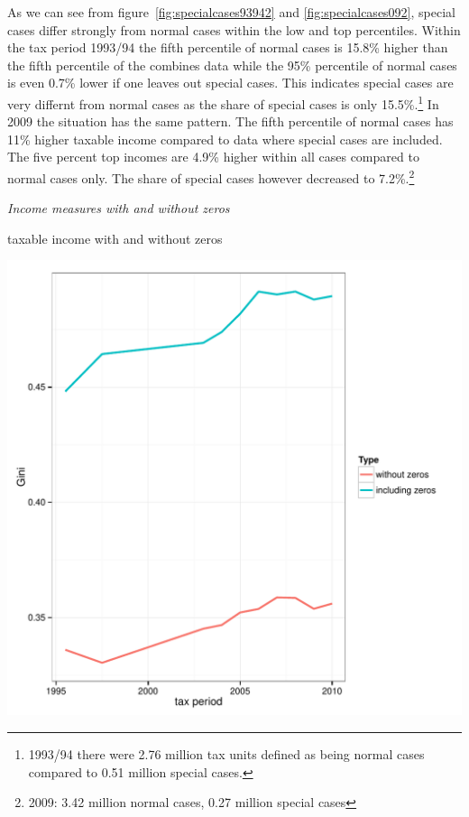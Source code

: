 \documentclass[twoside]{article}\usepackage[]{graphicx}\usepackage[]{color}
\makeatletter
\def\maxwidth{ %
  \ifdim\Gin@nat@width>\linewidth
    \linewidth
  \else
    \Gin@nat@width
  \fi
}
\newenvironment{knitrout}{}{} %
\makeatother
\begin{document}
\begin{multicols}{2}
\begin{knitrout}
\end{knitrout}



As we can see from figure~\ref{fig:specialcases93942} and \ref{fig:specialcases092}, special cases differ strongly 
from normal cases within the low and top percentiles. Within the tax period 1993/94 the fifth percentile of 
normal cases is 15.8\% higher than the fifth percentile of the combines data while the 95\% percentile of 
normal cases is even 0.7\% lower if one leaves out special cases. This indicates special cases are very 
differnt from normal cases as the share of special cases is only 15.5\%.\footnote{1993/94 there were 2.76 
million tax units defined as being normal cases compared to 0.51 million special cases.}
In 2009 the situation has the same pattern. The fifth percentile of normal cases has 11\% higher taxable 
income compared to data where special cases are included. The five percent top incomes are 4.9\% higher 
within all cases compared to normal cases only. The share of special cases however decreased 
to 7.2\%.\footnote{2009: 3.42 million normal cases, 0.27 million special cases}



\emph{Income measures with and without zeros}

taxable income with and without zeros

\begin{knitrout}
\color{fgcolor}
\includegraphics[width=\maxwidth]{figure/with_without_zeros1} 


\end{knitrout}
\end{multicols}
\end{document}
